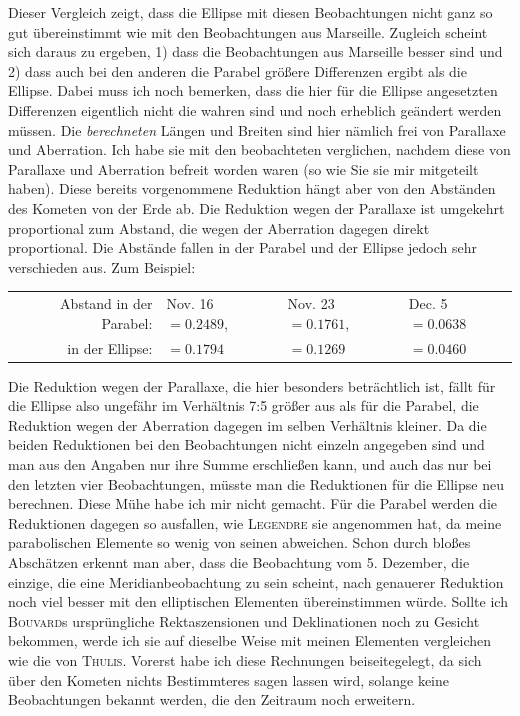 \par\indent Dieser Vergleich zeigt, dass die Ellipse mit diesen Beobachtungen nicht ganz so gut übereinstimmt wie mit den Beobachtungen aus Marseille. Zugleich scheint sich daraus zu ergeben, 1) dass die Beobachtungen aus Marseille besser sind und 2) dass auch bei den anderen die Parabel größere Differenzen ergibt als die Ellipse. Dabei muss ich noch bemerken, dass die hier für die Ellipse angesetzten Differenzen eigentlich nicht die wahren sind und noch erheblich geändert werden müssen. Die \emph{berechneten} Längen und Breiten sind hier nämlich frei von Parallaxe und Aberration. Ich habe sie mit den beobachteten verglichen, nachdem diese von Parallaxe und Aberration befreit worden waren (so wie Sie sie mir mitgeteilt haben). Diese bereits vorgenommene Reduktion hängt aber von den Abständen des Kometen von der Erde ab. Die Reduktion wegen der Parallaxe ist umgekehrt proportional zum Abstand, die wegen der Aberration dagegen direkt proportional. Die Abstände fallen in der Parabel und der Ellipse jedoch sehr verschieden aus. Zum Beispiel:

\begin{center}\begingroup
\fontsize{9}{11}\selectfont
\setlength{\tabcolsep}{2pt}\renewcommand{\arraystretch}{1.12}
\begin{tabular}{rlll}
Abstand in der Parabel: & Nov. 16 $=0.2489$, & Nov. 23 $=0.1761$, & Dec. 5 $=0.0638$ \\
in der Ellipse: & $=0.1794$ & $=0.1269$ & $=0.0460$ \\
\end{tabular}\endgroup\end{center}
%
\par\indent Die Reduktion wegen der Parallaxe, die hier besonders beträchtlich ist, fällt für die Ellipse also ungefähr im Verhältnis 7:5 größer aus als für die Parabel, die Reduktion wegen der Aberration dagegen im selben Verhältnis kleiner. Da die beiden Reduktionen bei den Beobachtungen nicht einzeln angegeben sind und man aus den Angaben nur ihre Summe erschließen kann, und auch das nur bei den letzten vier Beobachtungen, müsste man die Reduktionen für die Ellipse neu berechnen. Diese Mühe habe ich mir nicht gemacht. Für die Parabel werden die Reduktionen dagegen so ausfallen, wie \textsc{Legendre} sie angenommen hat, da meine parabolischen Elemente so wenig von seinen abweichen. Schon durch bloßes Abschätzen erkennt man aber, dass die Beobachtung vom 5. Dezember, die einzige, die eine Meridianbeobachtung zu sein scheint, nach genauerer Reduktion noch viel besser mit den elliptischen Elementen übereinstimmen würde. Sollte ich \textsc{Bouvard}s ursprüngliche Rektaszensionen und Deklinationen noch zu Gesicht bekommen, werde ich sie auf dieselbe Weise mit meinen Elementen vergleichen wie die von \textsc{Thulis}. Vorerst habe ich diese Rechnungen beiseitegelegt, da sich über den Kometen nichts Bestimmteres sagen lassen wird, solange keine Beobachtungen bekannt werden, die den Zeitraum noch erweitern.

